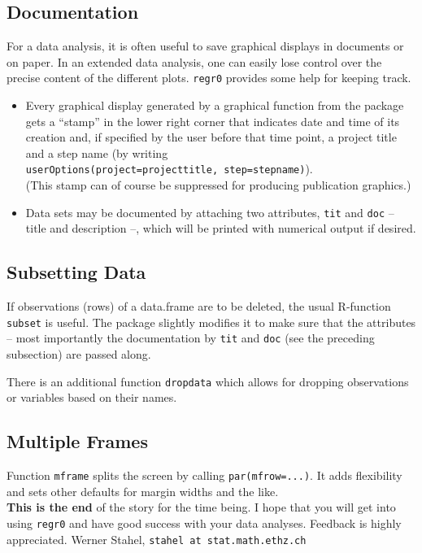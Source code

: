 \documentclass{article}
\providecommand{\T}{\texttt}
\providecommand{\Tit}[1]{\textbf{#1}\hspace{1em}}
\begin{document}
\subsection{Documentation}
For a data analysis, it is often useful to save graphical displays in 
documents or on paper. In an extended data analysis, one can easily lose
control over the precise content of the different plots.
\T{regr0} provides some help for keeping track.
\begin{itemize}
\item 
  Every graphical display generated by a graphical function from the
  package gets a ``stamp'' in the lower right corner that indicates date
  and time of its creation and, if specified by the user before that 
  time point, a project title and a step name (by writing\\
  \T{userOptions(project=projecttitle, step=stepname)}).\\
  (This stamp can of course be suppressed for producing publication
  graphics.) 
\item
  Data sets may be documented by attaching two attributes, \T{tit} and 
  \T{doc} -- title and description --, which will be printed with
  numerical output if desired.
\end{itemize}

\subsection{Subsetting Data}
If observations (rows) of a data.frame are to be deleted, the usual
R-function \T{subset} is useful. The package slightly modifies it to make
sure that the attributes -- most importantly the documentation by
\T{tit} and \T{doc} (see the preceding subsection) are passed along.

There is an additional function \T{dropdata} which allows for dropping
observations or variables based on their names.

\subsection{Multiple Frames}
Function \T{mframe} splits the screen by calling \T{par(mfrow=...)}.
It adds flexibility and sets other defaults for margin widths and the like. 
\\[10mm]

{\small
\Tit{This is the end} of the story for the time being. I hope that you will
get into using \T{regr0} and have good success with your data analyses.
Feedback is highly appreciated.
Werner Stahel, \T{stahel at stat.math.ethz.ch}
}
\end{document}
